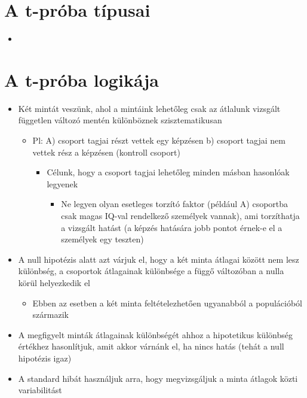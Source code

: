 \documentclass[
  letterpaper,
  DIV=11,
  numbers=noendperiod]{scrreprt}
\providecommand{\tightlist}{%
  \setlength{\itemsep}{0pt}\setlength{\parskip}{0pt}}\usepackage{longtable,booktabs,array}
\begin{document}
\hypertarget{a-t-pruxf3ba-tuxedpusai}{%
\section{A t-próba típusai}\label{a-t-pruxf3ba-tuxedpusai}}

\begin{itemize}
\tightlist
\item
\end{itemize}

\hypertarget{a-t-pruxf3ba-logikuxe1ja}{%
\section{A t-próba logikája}\label{a-t-pruxf3ba-logikuxe1ja}}

\begin{itemize}
\item
  Két mintát veszünk, ahol a mintáink lehetőleg csak az átlalunk
  vizsgált független változó mentén különböznek szisztematikusan

  \begin{itemize}
  \item
    Pl: A) csoport tagjai részt vettek egy képzésen b) csoport tagjai
    nem vettek rész a képzésen (kontroll csoport)

    \begin{itemize}
    \item
      Célunk, hogy a csoport tagjai lehetőleg minden másban hasonlóak
      legyenek

      \begin{itemize}
      \tightlist
      \item
        Ne legyen olyan esetleges torzító faktor (például A) csoportba
        csak magas IQ-val rendelkező személyek vannak), ami torzíthatja
        a vizsgált hatást (a képzés hatására jobb pontot érnek-e el a
        személyek egy teszten)
      \end{itemize}
    \end{itemize}
  \end{itemize}
\item
  A null hipotézis alatt azt várjuk el, hogy a két minta átlagai között
  nem lesz különbség, a csoportok átlagainak különbsége a függő
  változóban a nulla körül helyezkedik el

  \begin{itemize}
  \tightlist
  \item
    Ebben az esetben a két minta feltételezhetően ugyanabból a
    populációból származik
  \end{itemize}
\item
  A megfigyelt minták átlagainak különbségét ahhoz a hipotetikus
  különbség értékhez hasonlítjuk, amit akkor várnánk el, ha nincs hatás
  (tehát a null hipotézis igaz)
\item
  A standard hibát használjuk arra, hogy megvizsgáljuk a minta átlagok
  közti variabilitást


\end{itemize}
\end{document}
